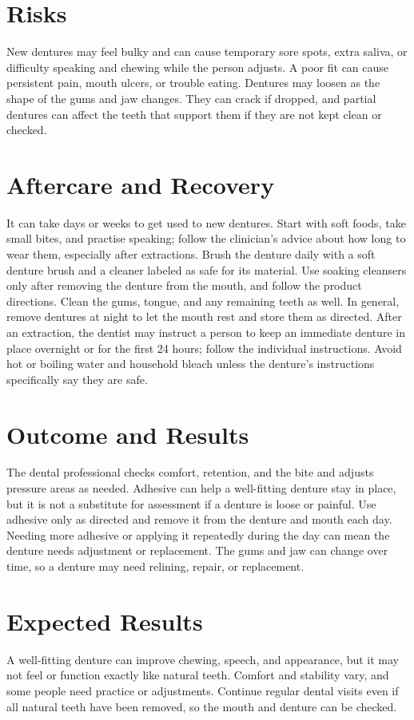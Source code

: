 \section*{Risks}
New dentures may feel bulky and can cause temporary sore spots, extra saliva, or difficulty speaking and chewing while the person adjusts. A poor fit can cause persistent pain, mouth ulcers, or trouble eating. Dentures may loosen as the shape of the gums and jaw changes. They can crack if dropped, and partial dentures can affect the teeth that support them if they are not kept clean or checked.

\section*{Aftercare and Recovery}
It can take days or weeks to get used to new dentures. Start with soft foods, take small bites, and practise speaking; follow the clinician's advice about how long to wear them, especially after extractions. Brush the denture daily with a soft denture brush and a cleaner labeled as safe for its material. Use soaking cleansers only after removing the denture from the mouth, and follow the product directions. Clean the gums, tongue, and any remaining teeth as well. In general, remove dentures at night to let the mouth rest and store them as directed. After an extraction, the dentist may instruct a person to keep an immediate denture in place overnight or for the first 24 hours; follow the individual instructions. Avoid hot or boiling water and household bleach unless the denture's instructions specifically say they are safe.

\section*{Outcome and Results}
The dental professional checks comfort, retention, and the bite and adjusts pressure areas as needed. Adhesive can help a well-fitting denture stay in place, but it is not a substitute for assessment if a denture is loose or painful. Use adhesive only as directed and remove it from the denture and mouth each day. Needing more adhesive or applying it repeatedly during the day can mean the denture needs adjustment or replacement. The gums and jaw can change over time, so a denture may need relining, repair, or replacement.

\section*{Expected Results}
A well-fitting denture can improve chewing, speech, and appearance, but it may not feel or function exactly like natural teeth. Comfort and stability vary, and some people need practice or adjustments. Continue regular dental visits even if all natural teeth have been removed, so the mouth and denture can be checked.

